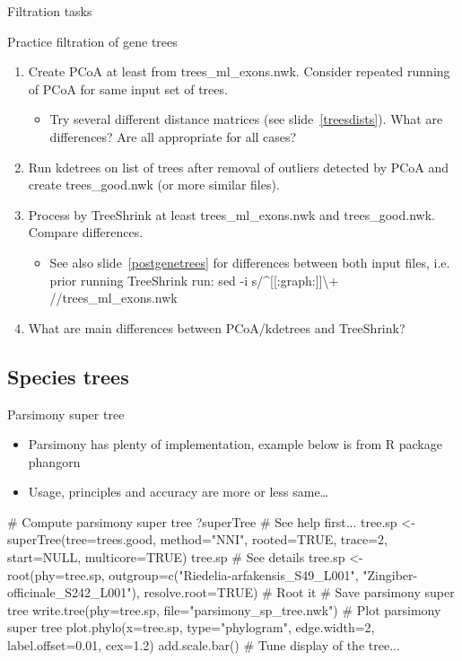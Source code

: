 \documentclass[compress,  xelatex, 11pt, xcolor=x11names, aspectratio=169,
	hyperref={
		bookmarks=true,
		unicode=true,
		colorlinks=true,
		pdftitle={HybSeq course},
		plainpages=false,
		pdfauthor={Vojtech Zeisek},
		pdfsubject={Practical processing of HybSeq target enrichment sequencing data on computing grids like MetaCentrum},
		pdfcreator={XeLaTeX},
		pdfkeywords={BASH, command line, GNU, HybSeq, Linux, MetaCentrum, sequencing shell, target enrichment},
		linkcolor=Turquoise4, %
		anchorcolor=DodgerBlue4, %
		citecolor=DodgerBlue4, %
		filecolor=DodgerBlue4, %
		menucolor=Tan4, %
		urlcolor=DarkOliveGreen4 %
		},
	url={hyphens, lowtilde} %
	]{beamer}
\renewcommand{\texttt}[1]{\colorbox{Cornsilk2}{{\ttfamily #1}}}
\begin{document}
\begin{frame}{Filtration tasks}
	\begin{exampleblock}{Practice filtration of gene trees}
		\begin{enumerate}
			\item Create PCoA at least from \texttt{trees\_ml\_exons.nwk}. Consider repeated running of PCoA for same input set of trees.
			\begin{itemize}
				\item Try several different distance matrices (see slide~\ref{treesdists}). What are differences? Are all appropriate for all cases?
			\end{itemize}
			\item Run kdetrees on list of trees after removal of outliers detected by PCoA and create \texttt{trees\_good.nwk} (or more similar files).
			\item Process by TreeShrink at least \texttt{trees\_ml\_exons.nwk} and \texttt{trees\_good.nwk}. Compare differences.
			\begin{itemize}
				\item See also slide~\ref{postgenetrees} for differences between both input files, i.e. prior running TreeShrink run: \texttt{sed -i \textquotesingle s/\^{}[[:graph:]]\textbackslash{}+{ }//\textquotesingle{ }trees\_ml\_exons.nwk}
			\end{itemize}
			\item What are main differences between PCoA/kdetrees and TreeShrink?
		\end{enumerate}
	\end{exampleblock}
\end{frame}

\subsection{Species trees}

\begin{frame}[fragile]{Parsimony super tree}
	\begin{itemize}
		\item Parsimony has plenty of implementation, example below is from \texttt{R} package \texttt{phangorn}
		\item Usage, principles and accuracy are more or less same\ldots
	\end{itemize}
	\begin{spluscode}
    # Compute parsimony super tree
    ?superTree # See help first...
    tree.sp <- superTree(tree=trees.good, method="NNI", rooted=TRUE,
      trace=2, start=NULL, multicore=TRUE)
    tree.sp # See details
    tree.sp <- root(phy=tree.sp, outgroup=c("Riedelia-arfakensis_S49_L001",
      "Zingiber-officinale_S242_L001"), resolve.root=TRUE) # Root it
    # Save parsimony super tree
    write.tree(phy=tree.sp, file="parsimony_sp_tree.nwk")
    # Plot parsimony super tree
    plot.phylo(x=tree.sp, type="phylogram", edge.width=2,
      label.offset=0.01, cex=1.2)
    add.scale.bar()
    # Tune display of the tree...
	\end{spluscode}
\end{frame}
\end{document}
